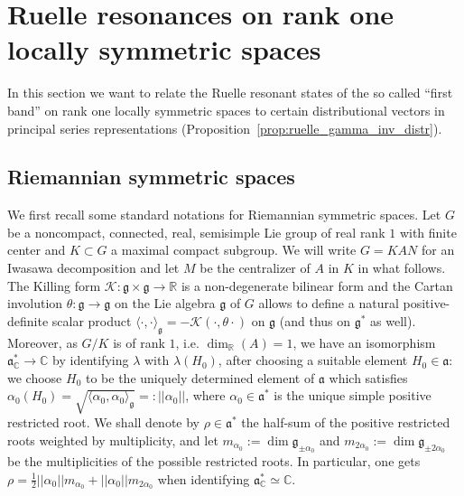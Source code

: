 \documentclass[10pt]{amsart}
\theoremstyle{definition}
\newcommand{\mc}{\mathcal}
\newcommand{\rr}{\mathbb{R}}
\newcommand{\cc}{\mathbb{C}}
\newcommand{\x}{\times}
\newcommand{\cjd}{\rangle}
\newcommand{\cjg}{\langle}
\newcommand{\demi}{\tfrac{1}{2}}
\newcommand{\R}{\mathbb R}
\newcommand{\g}{\mathfrak g}
\begin{document}
\section{Ruelle resonances on rank one locally symmetric spaces}
In this section we want to relate the Ruelle resonant states of the so called ``first band'' on rank one locally symmetric spaces to certain distributional vectors in principal series representations (Proposition~\ref{prop:ruelle_gamma_inv_distr}).

\subsection{Riemannian symmetric spaces}\label{sec:rieman_sym_space}
We first recall some standard notations for Riemannian symmetric spaces. Let $G$ be a noncompact, connected, real, semisimple Lie group of real rank $1$ with finite center and $K\subset G$ a maximal compact subgroup. We will write $G=KAN$ for an Iwasawa decomposition and let $M$ be the centralizer of $A$ in $K$ in what follows. The Killing form $\mc{K}:\mathfrak{g}\x \mathfrak{g}\to \rr$ is a non-degenerate bilinear form and the Cartan involution $\theta:\mathfrak{g}\to \mathfrak{g}$ on the Lie algebra $\mathfrak{g}$ of $G$ allows to define a natural positive-definite scalar product $\cjg \cdot,\cdot\cjd_{\mathfrak{g}}=-\mc{K}(\cdot,\theta\cdot)$ on $\mathfrak{g}$ (and thus on $\mathfrak g^*$ as well). Moreover, as $G/K$ is of rank $1$, i.e. $\dim_\R(A)=1$, we have an isomorphism $\mathfrak a_\cc^*\to \cc$ by identifying $\lambda$ with $\lambda(H_0)$, after choosing a suitable element $H_0\in\mathfrak a$: we choose $H_0$ to be the uniquely determined element of $\mathfrak a$ which satisfies $\alpha_0(H_0)=\sqrt{\cjg \alpha_0,\alpha_0\cjd_{\mathfrak{g}}}=:||\alpha_0||$, where $\alpha_0\in\mathfrak a^*$ is the unique simple positive restricted root. We shall denote by $\rho\in\mathfrak a^*$ the half-sum of the positive restricted roots weighted by multiplicity, and let $m_{\alpha_0} := \dim \g_{\pm\alpha_0}$ and $m_{2\alpha_0}:=\dim\g_{\pm2\alpha_0}$ be the multiplicities of the possible restricted roots. In particular, one gets $\rho=\demi ||\alpha_0||m_{\alpha_0}+||\alpha_0||m_{2\alpha_0}$ when identifying $\mathfrak a_\cc^*\simeq \cc$.
\end{document}
